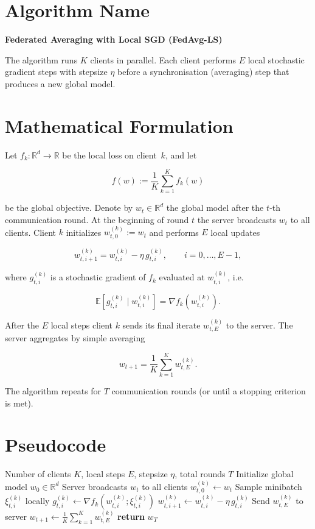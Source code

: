 \documentclass{article}
\newcommand{\E}{\mathbb{E}}
\newcommand{\R}{\mathbb{R}}
\begin{document}
\section*{Algorithm Name}
\textbf{Federated Averaging with Local SGD (FedAvg-LS)}  

The algorithm runs $K$ clients in parallel.  
Each client performs $E$ local stochastic gradient steps with stepsize $\eta$ before a
synchronisation (averaging) step that produces a new global model.

\section*{Mathematical Formulation}
Let $f_k:\R^d\!\rightarrow\!\R$ be the local loss on client~$k$, and let  

\[
f(w):=\frac1K\sum_{k=1}^{K}f_k(w)
\]

be the global objective.  
Denote by $w_t\in\R^d$ the global model after the $t$‑th communication round.
At the beginning of round $t$ the server broadcasts $w_t$ to all clients.
Client $k$ initializes $w_{t,0}^{(k)}:=w_t$ and performs $E$ local updates

\[
\boxed{
w_{t,i+1}^{(k)} = w_{t,i}^{(k)} - \eta\, g_{t,i}^{(k)},
\qquad i=0,\dots ,E-1,
}
\tag{1}
\]

where $g_{t,i}^{(k)}$ is a stochastic gradient of $f_k$ evaluated at $w_{t,i}^{(k)}$,
i.e.  

\[
\E\!\left[g_{t,i}^{(k)}\mid w_{t,i}^{(k)}\right]=\nabla f_k\!\left(w_{t,i}^{(k)}\right).
\]

After the $E$ local steps client $k$ sends its final iterate 
$w_{t,E}^{(k)}$ to the server.  The server aggregates by simple averaging

\[
\boxed{
w_{t+1}= \frac1K\sum_{k=1}^{K} w_{t,E}^{(k)} .
}
\tag{2}
\]

The algorithm repeats for $T$ communication rounds (or until a stopping
criterion is met).

\section*{Pseudocode}
\begin{algorithm}[H]
\caption{FedAvg-LS}
\begin{algorithmic}[1]
\Require Number of clients $K$, local steps $E$, stepsize $\eta$, total rounds $T$
\State Initialize global model $w_0\in\R^d$
    \State Server broadcasts $w_t$ to all clients
        \State $w_{t,0}^{(k)}\gets w_t$
            \State Sample minibatch $\xi_{t,i}^{(k)}$ locally
            \State $g_{t,i}^{(k)}\gets \nabla f_k\!\left(w_{t,i}^{(k)};\xi_{t,i}^{(k)}\right)$
            \State $w_{t,i+1}^{(k)}\gets w_{t,i}^{(k)}-\eta\, g_{t,i}^{(k)}$
        \EndFor
        \State Send $w_{t,E}^{(k)}$ to server
    \EndFor
    \State $w_{t+1}\gets\frac1K\sum_{k=1}^{K} w_{t,E}^{(k)}$ \hfill{}
\EndFor
\State \textbf{return} $w_T$
\end{algorithmic}
\end{algorithm}
\end{document}
